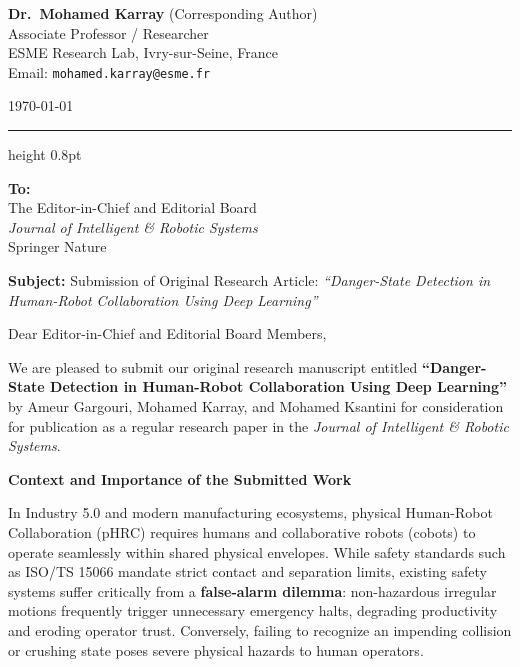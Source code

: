 \documentclass[11pt,a4paper]{article}
\begin{document}
\begin{minipage}[t]{0.68\textwidth}
    {\large \textbf{Dr.\ Mohamed Karray}} (Corresponding Author) \\
    Associate Professor / Researcher \\
    ESME Research Lab, Ivry-sur-Seine, France \\
    Email: \texttt{mohamed.karray@esme.fr}
\end{minipage}
\hfill
\begin{minipage}[t]{0.28\textwidth}
    \raggedleft
    \today
\end{minipage}

\vspace{0.8em}
\hrule height 0.8pt
\vspace{0.8em}

\textbf{To:} \\
The Editor-in-Chief and Editorial Board \\
\textit{Journal of Intelligent \& Robotic Systems} \\
Springer Nature

\vspace{0.6em}

\textbf{Subject:} Submission of Original Research Article: \textit{``Danger-State Detection in Human-Robot Collaboration Using Deep Learning''}

\vspace{0.5em}

Dear Editor-in-Chief and Editorial Board Members,

We are pleased to submit our original research manuscript entitled \textbf{``Danger-State Detection in Human-Robot Collaboration Using Deep Learning''} by Ameur Gargouri, Mohamed Karray, and Mohamed Ksantini for consideration for publication as a regular research paper in the \textit{Journal of Intelligent \& Robotic Systems}.

\vspace{0.3em}
{\large\textbf{Context and Importance of the Submitted Work}}\par\vspace{2pt}
In Industry 5.0 and modern manufacturing ecosystems, physical Human-Robot Collaboration (pHRC) requires humans and collaborative robots (cobots) to operate seamlessly within shared physical envelopes. While safety standards such as ISO/TS 15066 mandate strict contact and separation limits, existing safety systems suffer critically from a \textbf{false-alarm dilemma}: non-hazardous irregular motions frequently trigger unnecessary emergency halts, degrading productivity and eroding operator trust. Conversely, failing to recognize an impending collision or crushing state poses severe physical hazards to human operators.
\end{document}

